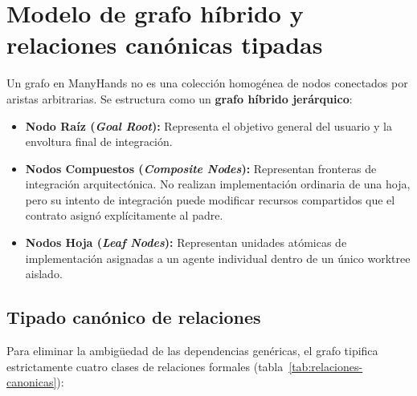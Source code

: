 \section{Modelo de grafo híbrido y relaciones canónicas tipadas}
\label{sec:grafo-hibrido}

Un grafo en ManyHands no es una colección homogénea de nodos conectados por aristas arbitrarias. Se estructura como un \textbf{grafo híbrido jerárquico}:
\begin{itemize}
  \item \textbf{Nodo Raíz (\emph{Goal Root}):} Representa el objetivo general del usuario y la envoltura final de integración.
  \item \textbf{Nodos Compuestos (\emph{Composite Nodes}):} Representan fronteras de integración arquitectónica. No realizan implementación ordinaria de una hoja, pero su intento de integración puede modificar recursos compartidos que el contrato asignó explícitamente al padre.
  \item \textbf{Nodos Hoja (\emph{Leaf Nodes}):} Representan unidades atómicas de implementación asignadas a un agente individual dentro de un único worktree aislado.
\end{itemize}

\subsection{Tipado canónico de relaciones}

Para eliminar la ambigüedad de las dependencias genéricas, el grafo tipifica estrictamente cuatro clases de relaciones formales (tabla~\ref{tab:relaciones-canonicas}):

